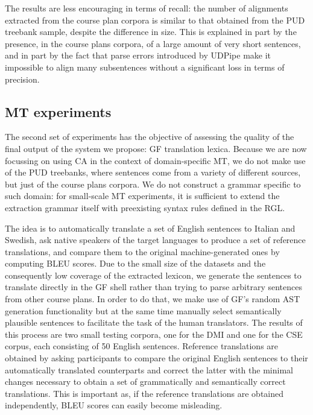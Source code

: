 \documentclass[11pt]{article}
\begin{document}
The results are less encouraging in terms of recall: the number of alignments extracted from the course plan corpora is similar to that obtained from the PUD treebank sample, despite the difference in size. 
This is explained in part by the presence, in the course plans corpora, of a large amount of very short sentences, and in part by the fact that parse errors introduced by UDPipe make it impossible to align many subsentences without a significant loss in terms of precision.  

\subsection{MT experiments} \label{mtexp}
The second set of experiments has the objective of assessing the quality of the final output of the system we propose: GF translation lexica. 
Because we are now focussing on using CA in the context of domain-specific MT, we do not make use of the PUD treebanks, where sentences come from a variety of different sources, but just of the course plans corpora. 
We do not construct a grammar specific to such domain: for small-scale MT experiments, it is sufficient to extend the extraction grammar itself with preexisting syntax rules defined in the RGL. 

The idea is to automatically translate a set of English sentences to Italian and Swedish, ask native speakers of the target languages to produce a set of reference translations, and compare them to the original machine-generated ones by computing BLEU scores.
Due to the small size of the datasets and the consequently low coverage of the extracted lexicon, we generate the sentences to translate directly in the GF shell rather than trying to parse arbitrary sentences from other course plans. 
In order to do that, we make use of GF's random AST generation functionality but at the same time manually select semantically plausible sentences to facilitate the task of the human translators.
The results of this process are two small testing corpora, one for the DMI and one for the CSE corpus, each consisting of 50 English sentences. 
Reference translations are obtained by asking participants to compare the original English sentences to their automatically translated counterparts and correct the latter with the minimal changes necessary to obtain a set of grammatically and semantically correct translations. 
This is important as, if the reference translations are obtained independently, BLEU scores can easily become misleading.
\end{document}
